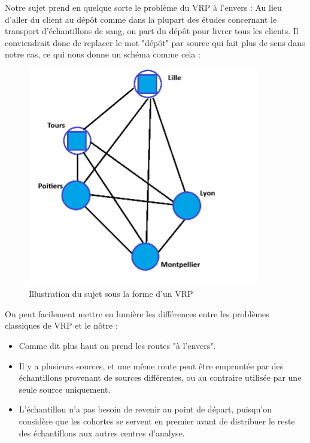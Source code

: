 \documentclass{polytech/polytech}
\numberwithin{figure}{chapter}
\begin{document}
Notre sujet prend en quelque sorte le problème du VRP à l'envers : Au lieu d'aller du client au dépôt comme dans la plupart des études concernant le transport d'échantillons de sang, on part du dépôt pour livrer tous les clients. Il conviendrait donc de replacer le mot "dépôt" par source qui fait plus de sens dans notre cas, ce qui nous donne un schéma comme cela : 

\begin{figure}[h]
    \centering
    \includegraphics[width=0.9\textwidth]{pic/VRPPRD.png}
    \caption{Illustration du sujet sous la forme d'un VRP}
    \label{Illustration du sujet sous la forme d'un VRP}
\end{figure}

On peut facilement mettre en lumière les différences entre les problèmes classiques de VRP et le nôtre : 
\begin{itemize}
	\item Comme dit plus haut on prend les routes "à l'envers".
	\item Il y a plusieurs sources, et une même route peut être empruntée par des échantillons provenant de sources différentes, ou au contraire utilisée par une seule source uniquement.
	\item L'échantillon n'a pas besoin de revenir au point de départ, puisqu'on considère que les cohortes se servent en premier avant de distribuer le reste des échantillons aux autres centres d'analyse.
\end{itemize}
\end{document}

